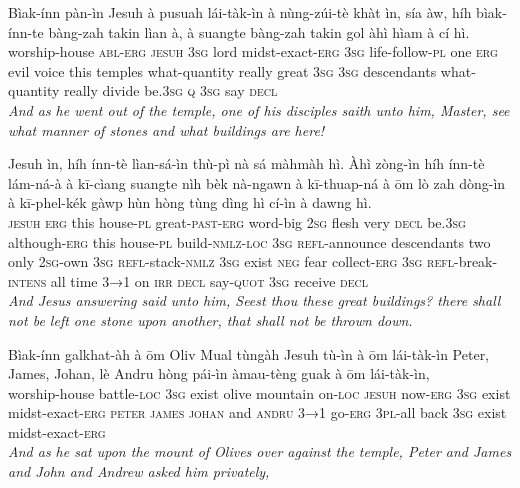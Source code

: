 \documentclass[11pt,a4paper]{article}
\begin{document}
\begin{exe}
\gll Bìak-ínn pàn-ìn Jesuh à pusuah lái-tàk-ìn à nùng-zúi-tè khàt ìn, sía àw, híh bìak-ínn-te bàng-zah takin lìan à, à suangte bàng-zah takin gol àhì hìam à cí hì. \\
     worship-house \textsc{abl}-\textsc{erg} \textsc{jesuh} \textsc{3sg} lord midst-exact-\textsc{erg} \textsc{3sg} life-follow-\textsc{pl} one \textsc{erg} evil voice this temples what-quantity really great \textsc{3sg} \textsc{3sg} descendants what-quantity really divide be.\textsc{3sg} \textsc{q} \textsc{3sg} say \textsc{decl} \\
\glt \textcolor{kjvcolor}{\textit{And as he went out of the temple, one of his disciples saith unto him, Master, see what manner of stones and what buildings are here!}}

\gll Jesuh ìn, híh ínn-tè lìan-sá-ìn thù-pì nà sá màhmàh hì. Àhì zòng-ìn híh ínn-tè lám-ná-à à kī-cìang suangte nìh bèk nà-ngawn à kī-thuap-ná à ōm lò zah dòng-ìn à kī-phel-kék gàwp hùn hòng tùng dìng hì cí-ìn à dawng hì. \\
     \textsc{jesuh} \textsc{erg} this house-\textsc{pl} great-\textsc{past}-\textsc{erg} word-big \textsc{2sg} flesh very \textsc{decl} be.\textsc{3sg} although-\textsc{erg} this house-\textsc{pl} build-\textsc{nmlz}-\textsc{loc} \textsc{3sg} \textsc{refl}-announce descendants two only \textsc{2sg}-own \textsc{3sg} \textsc{refl}-stack-\textsc{nmlz} \textsc{3sg} exist \textsc{neg} fear collect-\textsc{erg} \textsc{3sg} \textsc{refl}-break-\textsc{intens} all time \textsc{3→1} on \textsc{irr} \textsc{decl} say-\textsc{quot} \textsc{3sg} receive \textsc{decl} \\
\glt \textcolor{kjvcolor}{\textit{And Jesus answering said unto him, Seest thou these great buildings? there shall not be left one stone upon another, that shall not be thrown down.}}

\gll Bìak-ínn galkhat-àh à ōm Oliv Mual tùngàh Jesuh tù-ìn à ōm lái-tàk-ìn Peter, James, Johan, lè Andru hòng pái-ìn àmau-tèng guak à ōm lái-tàk-ìn, \\
     worship-house battle-\textsc{loc} \textsc{3sg} exist olive mountain on-\textsc{loc} \textsc{jesuh} now-\textsc{erg} \textsc{3sg} exist midst-exact-\textsc{erg} \textsc{peter} \textsc{james} \textsc{johan} and \textsc{andru} \textsc{3→1} go-\textsc{erg} \textsc{3pl}-all back \textsc{3sg} exist midst-exact-\textsc{erg} \\
\glt \textcolor{kjvcolor}{\textit{And as he sat upon the mount of Olives over against the temple, Peter and James and John and Andrew asked him privately,}}


\end{exe}
\end{document}
